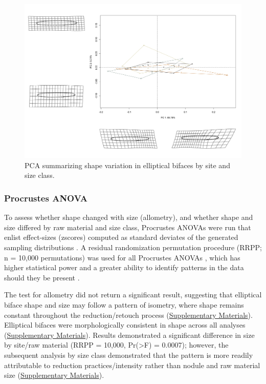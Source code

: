 \documentclass[]{interact}
\theoremstyle{plain}%
\theoremstyle{definition}
\theoremstyle{remark}
\begin{document}
\begin{figure}\centering
\includegraphics[width=\linewidth]{figs/pca.png}
\caption{PCA summarizing shape variation in elliptical bifaces by site and size class. }
\label{fig:pca}
\end{figure}

\hypertarget{procrustes-anova}{%
\subsubsection{Procrustes ANOVA}\label{procrustes-anova}}

To assess whether shape changed with size (allometry), and whether shape
and size differed by raw material and size class, Procrustes ANOVAs
\citep{RN1749} were run that enlist effect-sizes (zscores) computed as
standard deviates of the generated sampling distributions
\citep{RN1756}. A residual randomization permutation procedure (RRPP; n
= 10,000 permutations) was used for all Procrustes ANOVAs
\citep{RN1655,RN11775}, which has higher statistical power and a greater
ability to identify patterns in the data should they be present
\citep{RN1719}.

The test for allometry did not return a significant result, suggesting
that elliptical biface shape and size may follow a pattern of isometry,
where shape remains constant throughout the reduction/retouch process
(\href{https://seldenlab.github.io/elliptical.bifaces/}{Supplementary
Materials}). Elliptical bifaces were morphologically consistent in shape
across all analyses
(\href{https://seldenlab.github.io/elliptical.bifaces/}{Supplementary
Materials}). Results demonstrated a significant difference in size by
site/raw material (RRPP = 10,000, Pr(\textgreater F) = 0.0007); however,
the subsequent analysis by size class demonstrated that the pattern is
more readily attributable to reduction practices/intensity rather than
nodule and raw material size
(\href{https://seldenlab.github.io/elliptical.bifaces/}{Supplementary
Materials}).
\end{document}
